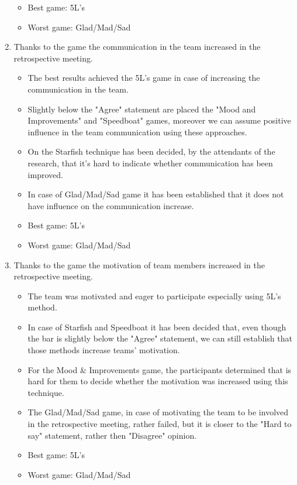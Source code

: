 \begin{enumerate}
\begin{itemize}
        \item Best game: 5L's
        \item Worst game: Glad/Mad/Sad
    \end{itemize}
    \item Thanks to the game the communication in the team increased in the retrospective meeting.
    \begin{itemize}
        \item The best results achieved the 5L's game in case of increasing the communication in the team.
        \item Slightly below the "Agree" statement are placed the "Mood and Improvements" and "Speedboat" games, moreover we can assume positive influence in the team communication using these approaches. 
        \item On the Starfish technique has been decided, by the attendants of the research, that it's hard to indicate whether communication has been improved.
        \item In case of Glad/Mad/Sad game it has been established that it does not have influence on the communication increase. 
        \item Best game: 5L's
        \item Worst game: Glad/Mad/Sad
    \end{itemize}
    \item Thanks to the game the motivation of team members increased in the retrospective meeting.
    \begin{itemize}
        \item The team was motivated and eager to participate especially using 5L's method. 
        \item In case of Starfish and Speedboat it has been decided that, even though the bar is slightly below the "Agree" statement, we can still establish that those methods increase teams' motivation. 
        \item For the Mood \& Improvements game, the participants determined that is hard for them to decide whether the motivation was increased using this technique.
        \item The Glad/Mad/Sad game, in case of motivating the team to be involved in the retrospective meeting, rather failed, but it is closer to the "Hard to say" statement, rather then "Disagree" opinion.
        \item Best game: 5L's
        \item Worst game: Glad/Mad/Sad
    \end{itemize}

\end{enumerate}
